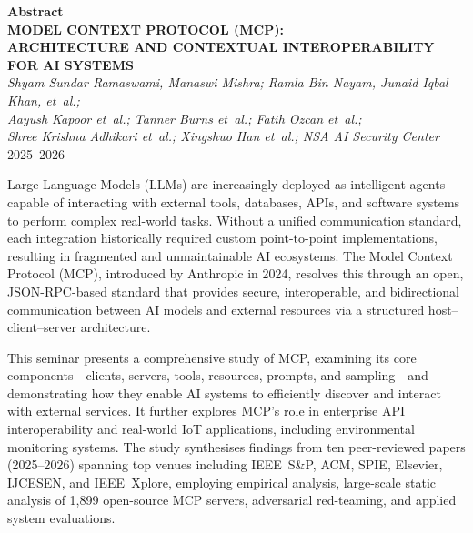 \documentclass[12pt,a4paper]{report}
\begin{document}
\begin{center}
{\Large\textbf{Abstract}}\\[0.15em]

{\large\textbf{MODEL CONTEXT PROTOCOL (MCP):\\
ARCHITECTURE AND CONTEXTUAL INTEROPERABILITY FOR AI SYSTEMS}}\\[0.15em]

{\small\textit{Shyam Sundar Ramaswami, Manaswi Mishra; Ramla Bin Nayam, Junaid Iqbal Khan, et~al.;\\
Aayush Kapoor et~al.; Tanner Burns et~al.; Fatih Ozcan et~al.;\\
Shree Krishna Adhikari et~al.; Xingshuo Han et~al.; NSA AI Security Center}}\\[0.1em]

{\small 2025--2026}
\end{center}

\vspace{0.1em}

\setlength{\parskip}{2pt}
\setlength{\parindent}{1em}

\justifying

Large Language Models (LLMs) are increasingly deployed as intelligent agents capable of interacting with external tools, databases, APIs, and software systems to perform complex real-world tasks. Without a unified communication standard, each integration historically required custom point-to-point implementations, resulting in fragmented and unmaintainable AI ecosystems. The Model Context Protocol (MCP), introduced by Anthropic in 2024, resolves this through an open, JSON-RPC-based standard that provides secure, interoperable, and bidirectional communication between AI models and external resources via a structured host--client--server architecture.

This seminar presents a comprehensive study of MCP, examining its core components---clients, servers, tools, resources, prompts, and sampling---and demonstrating how they enable AI systems to efficiently discover and interact with external services. It further explores MCP's role in enterprise API interoperability and real-world IoT applications, including environmental monitoring systems. The study synthesises findings from ten peer-reviewed papers (2025--2026) spanning top venues including IEEE~S\&P, ACM, SPIE, Elsevier, IJCESEN, and IEEE~Xplore, employing empirical analysis, large-scale static analysis of 1,899 open-source MCP servers, adversarial red-teaming, and applied system evaluations.
\end{document}
